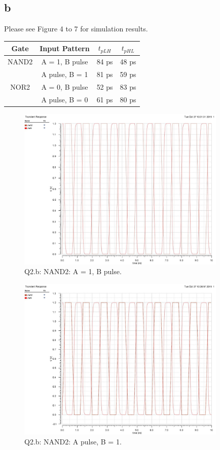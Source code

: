 \documentclass[a4paper,10pt]{article}
\begin{document}
\subsection*{b}
Please see Figure 4 to 7 for simulation results.\\
\begin{tabular}{|c|c|c|c|}
 \hline
 Gate & Input Pattern & \begin{math}t_{pLH}\end{math} & \begin{math}t_{pHL}\end{math}\\ \hline
 NAND2& A = 1, B pulse&84 ps&48 ps\\ \cline{2-4}
 &A pulse, B = 1&81 ps&59 ps\\ \hline
 NOR2& A = 0, B pulse&52 ps&83 ps\\ \cline{2-4}
 &A pulse, B = 0&61 ps&80 ps\\ \hline
\end{tabular}
\begin{figure}
 \centering
 \includegraphics[width=10cm]{HW4_Q2_b_NAND2_B_pulse.jpg}
 \caption{Q2.b: NAND2: A = 1, B pulse.}
\end{figure}
\begin{figure}
 \centering
 \includegraphics[width=10cm]{HW4_Q2_b_NAND2_A_pulse.jpg}
 \caption{Q2.b: NAND2: A pulse, B = 1.}
\end{figure}
\end{document}
